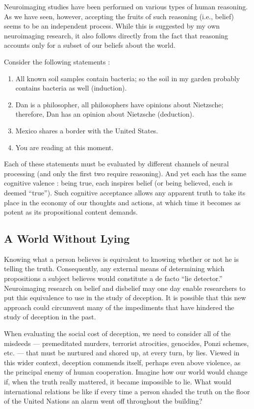 \documentclass[a4paper,14pt]{extarticle}
\begin{document}
Neuroimaging studies have been performed on various types of human reasoning.
As we have seen, however, accepting the fruits of such reasoning (i.e., belief) seems to be an independent process.
While this is suggested by my own neuroimaging research, it also follows directly from the fact that reasoning accounts only for a subset of our beliefs about the world.

Consider the following statements :

\begin{enumerate}
      \item
            All known soil samples contain bacteria; so the soil in my garden probably contains bacteria as well (induction).
      \item
            Dan is a philosopher, all philosophers have opinions about Nietzsche;
            therefore, Dan has an opinion about Nietzsche (deduction).
      \item
            Mexico shares a border with the United States.
      \item
            You are reading at this moment.

\end{enumerate}

Each of these statements must be evaluated by different channels of neural processing (and only the first two require reasoning).
And yet each has the same cognitive valence :
being true, each inspires belief (or being believed, each is deemed ``true'').
Such cognitive acceptance allows any apparent truth to take its place in the economy of our thoughts and actions, at which time it becomes as potent as its propositional content demands.

\subsection{A World Without Lying}

Knowing what a person believes is equivalent to knowing whether or not he is telling the truth.
Consequently, any external means of determining which propositions a subject believes would constitute a de facto ``lie detector.''
Neuroimaging research on belief and disbelief may one day enable researchers to put this equivalence to use in the study of deception.
It is possible that this new approach could circumvent many of the impediments that have hindered the study of deception in the past.

When evaluating the social cost of deception, we need to consider all of the misdeeds --- premeditated murders, terrorist atrocities, genocides, Ponzi schemes, etc. --- that must be nurtured and shored up, at every turn, by lies.
Viewed in this wider context, deception commends itself, perhaps even above violence, as the principal enemy of human cooperation.
Imagine how our world would change if, when the truth really mattered, it became impossible to lie.
What would international relations be like if every time a person shaded the truth on the floor of the United Nations an alarm went off throughout the building?
\end{document}
